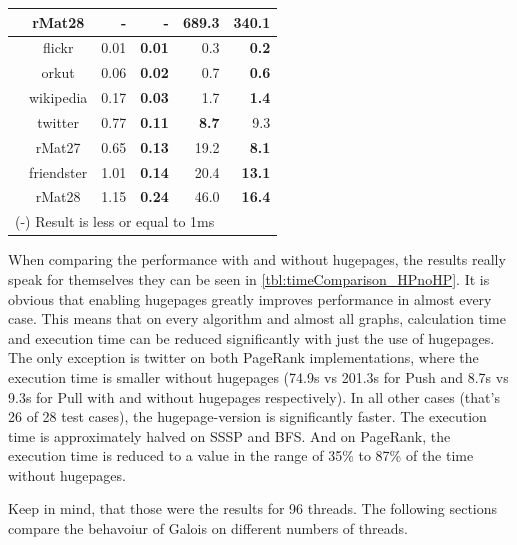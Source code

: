 \begin{table}
\begin{tabular}{ccr@{\tabskip 2 \tabcolsep}rr@{\tabskip 2 \tabcolsep}r}
		& rMat28 & - & - & 689.3 & \bf 340.1 \\
		\midrule
		\multirow{7}{0.5ex}{\rotatebox{90}{\bf PR Pull}}
		& flickr & 0.01 & \bf 0.01 & 0.3 & \bf 0.2 \\
		& orkut & 0.06 & \bf 0.02 & 0.7 & \bf 0.6 \\
		& wikipedia & 0.17 & \bf 0.03 & 1.7 & \bf 1.4 \\
		& twitter & 0.77 & \bf 0.11 & \bf 8.7 & 9.3 \\
		& rMat27 & 0.65 & \bf 0.13 & 19.2 & \bf 8.1 \\
		& friendster & 1.01 & \bf 0.14 & 20.4 & \bf 13.1 \\
		& rMat28 & 1.15 & \bf 0.24 & 46.0 & \bf 16.4 \\
		\bottomrule
		\multicolumn{6}{l}{(-) Result is less or equal to 1ms}
	\end{tabular}
\end{table}
When comparing the performance with and without hugepages, the results really speak for themselves they can be seen in \autoref{tbl:timeComparison_HPnoHP}. It is obvious that enabling hugepages greatly improves performance in almost every case. This means that on every algorithm and almost all graphs, calculation time and execution time can be reduced significantly with just the use of hugepages. The only exception is twitter on both PageRank implementations, where the execution time is smaller without hugepages (74.9s vs 201.3s for Push and 8.7s vs 9.3s for Pull with and without hugepages respectively). In all other cases (that's 26 of 28 test cases), the hugepage-version is significantly faster.
The execution time is approximately halved on SSSP and BFS. 
And on PageRank, the execution time is reduced to a value in the range of 35\% to 87\% of the time without hugepages.

Keep in mind, that those were the results for 96 threads. The following sections compare the behavoiur of Galois on different numbers of threads.


